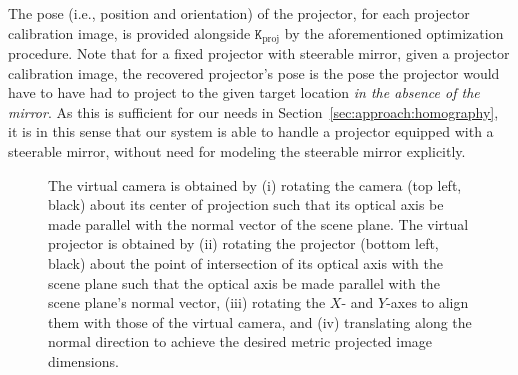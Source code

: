 \documentclass[review]{elsarticle}
\begin{document}
The pose (i.e., position and orientation) of the projector, for each projector calibration image, is provided alongside $\mathtt{K}_\text{proj}$ by the aforementioned optimization procedure. Note that for a fixed projector with steerable mirror, given a projector calibration image, the recovered projector's pose is the pose the projector would have to have had to project to the given target location \textit{in the absence of the mirror}. As this is sufficient for our needs in Section~\ref{sec:approach:homography}, it is in this sense that our system is able to handle a projector equipped with a steerable mirror, without need for modeling the steerable mirror explicitly.

\begin{figure}
    \centering
    \qquad
    \caption{The virtual camera is obtained by (i) rotating the camera (top left, black) about its center of projection such that its optical axis be made parallel with the normal vector of the scene plane. The virtual projector is obtained by (ii) rotating the projector (bottom left, black) about the point of intersection of its optical axis with the scene plane such that the optical axis be made parallel with the scene plane's normal vector, (iii) rotating the $X$- and $Y$-axes to align them with those of the virtual camera, and (iv) translating along the normal direction to achieve the desired metric projected image dimensions.} %
    \label{fig:virtualproj}
\end{figure}
\end{document}
